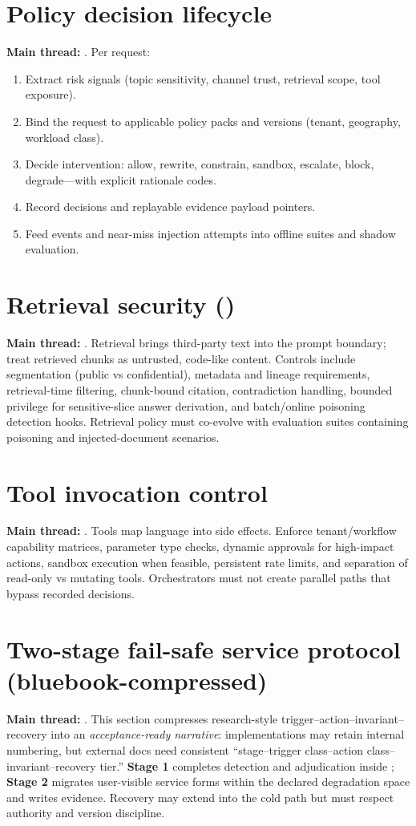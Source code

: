 \documentclass[11pt,a4paper]{report}
\begin{document}
\section{Policy decision lifecycle}
\textbf{Main thread:} \DecoupledSafety{}. Per request:
\begin{enumerate}
  \item Extract risk signals (topic sensitivity, channel trust, retrieval scope, tool exposure).
  \item Bind the request to applicable policy packs and versions (tenant, geography, workload class).
  \item Decide intervention: allow, rewrite, constrain, sandbox, escalate, block, degrade—with explicit rationale codes.
  \item Record decisions and replayable evidence payload pointers.
  \item Feed events and near-miss injection attempts into offline suites and shadow evaluation.
\end{enumerate}

\section{Retrieval security (\RAG{})}
\textbf{Main thread:} \ControlPlane{}. Retrieval brings third-party text into the prompt boundary; treat retrieved chunks as untrusted, code-like content. Controls include segmentation (public vs confidential), metadata and lineage requirements, retrieval-time filtering, chunk-bound citation, contradiction handling, bounded privilege for sensitive-slice answer derivation, and batch/online poisoning detection hooks. Retrieval policy must co-evolve with evaluation suites containing poisoning and injected-document scenarios.

\section{Tool invocation control}
\textbf{Main thread:} \ControlPlane{}. Tools map language into side effects. Enforce tenant/workflow capability matrices, parameter type checks, dynamic approvals for high-impact actions, sandbox execution when feasible, persistent rate limits, and separation of read-only vs mutating tools. Orchestrators must not create parallel paths that bypass recorded decisions.

\section{Two-stage fail-safe service protocol (bluebook-compressed)}
\textbf{Main thread:} \DecoupledSafety{}. This section compresses research-style trigger–action–invariant–recovery into an \emph{acceptance-ready narrative}: implementations may retain internal numbering, but external docs need consistent “stage–trigger class–action class–invariant–recovery tier.” \textbf{Stage 1} completes detection and adjudication inside \SafetyKernel{}; \textbf{Stage 2} migrates user-visible service forms within the declared degradation space and writes evidence. Recovery may extend into the cold path but must respect authority and version discipline.
\end{document}
